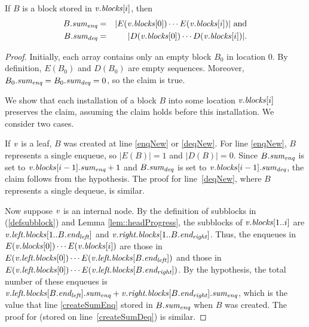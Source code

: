 \begin{invariant}
\label{inv::sum}
If $B$ is a block stored in $\var{v}.\fld{blocks}[i]$, then
\begin{eqnarray*}
B.\fld{sum\sub{enq}} &=& | E(\var{v}.\fld{blocks}[0])\cdots E(\var{v}.\fld{blocks}[i]) | \mbox{ and}\\
B.\fld{sum\sub{deq}} &=& | D(\var{v}.\fld{blocks}[0])\cdots D(\var{v}.\fld{blocks}[i]) |.
\end{eqnarray*}
\end{invariant}

\begin{proof}
Initially, each  array  contains only an empty block $B_0$ in location 0.
By definition, $E(B_0)$ and $D(B_0)$ are empty sequences.
Moreover, $B_0.\fld{sum\sub{enq}} = B_0.\fld{sum\sub{deq}} = 0$, so the claim is true.

We show that each installation of a block $B$ into some location $\var{v}.\fld{blocks}[i]$ preserves the claim,
assuming the claim holds before this installation.  We consider two cases.

If $\var{v}$ is a leaf, $B$ was created at line \ref{enqNew} or \ref{deqNew}.
For line \ref{enqNew}, $B$ represents a single enqueue, so $|E(B)|=1$ and $|D(B)|=0$.
Since $B.\fld{sum\sub{enq}}$ is set to $\var{v}.\fld{blocks}[i-1].\fld{sum\sub{enq}}+1$ and
$B.\fld{sum\sub{deq}}$ is set to $\var{v}.\fld{blocks}[i-1].\fld{sum\sub{deq}}$, the claim follows from the hypothesis.
The proof for line~\ref{deqNew}, where $B$ represents a single dequeue, is similar.

Now suppose $\var{v}$ is an internal node. By the definition of subblocks in (\ref{defsubblock}) and Lemma \ref{lem::headProgress}, the
subblocks of $\var{v}.\fld{blocks}[1..i]$ are $\var{v}.\fld{left.blocks}[1..B.\eleft]$ 
and $\var{v}.\fld{right.blocks}[1..B.\eright]$.
Thus, the enqueues in $E(\var{v}.\fld{blocks}[0])\cdots E(\var{v}.\fld{blocks}[i])$ are those in
$E(\var{v}.\fld{left.blocks}[0]) \cdots E(\var{v}.\fld{left.blocks}[B.\eleft])$ and those in 
$E(\var{v}.\fld{left.blocks}[0]) \cdots E(\var{v}.\fld{left.blocks}[B.\eright])$.
By the hypothesis, the total number of these enqueues is 
$\var{v}.\fld{left.blocks}[B.\eleft].\fld{sum\sub{enq}} + \var{v}.\fld{right.blocks}[B.\eright].\fld{sum\sub{enq}}$, 
which is the value that line \ref{createSumEnq} stored in $B.\fld{sum\sub{enq}}$ when $B$ was created.
The proof for  (stored on line~\ref{createSumDeq}) is similar.
\end{proof}

